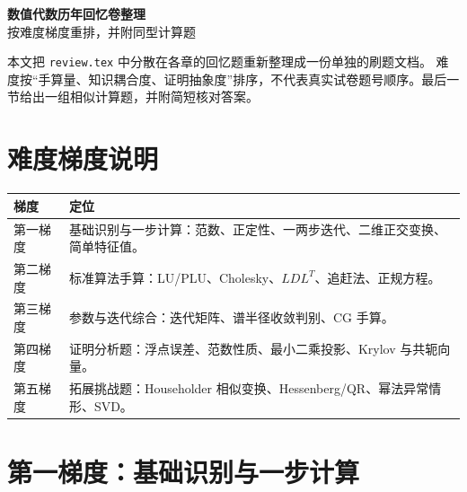 \documentclass{article}
\begin{document}
\pagestyle{fancy}
\fancyhead{}
\rhead{\today}

\begin{center}
  {\Large\bfseries 数值代数历年回忆卷整理}\\[6pt]
  {\large 按难度梯度重排，并附同型计算题}
\end{center}

\noindent 本文把 \texttt{review.tex} 中分散在各章的回忆题重新整理成一份单独的刷题文档。
难度按“手算量、知识耦合度、证明抽象度”排序，不代表真实试卷题号顺序。最后一节给出一组相似计算题，并附简短核对答案。

\tableofcontents
\newpage

\section{难度梯度说明}

\begin{center}
\begin{tabular}{@{}p{2.2cm}p{11.5cm}@{}}
\toprule
\textbf{梯度} & \textbf{定位}\\
\midrule
第一梯度 & 基础识别与一步计算：范数、正定性、一两步迭代、二维正交变换、简单特征值。\\
第二梯度 & 标准算法手算：LU/PLU、Cholesky、$LDL^T$、追赶法、正规方程。\\
第三梯度 & 参数与迭代综合：迭代矩阵、谱半径收敛判别、CG 手算。\\
第四梯度 & 证明分析题：浮点误差、范数性质、最小二乘投影、Krylov 与共轭向量。\\
第五梯度 & 拓展挑战题：Householder 相似变换、Hessenberg/QR、幂法异常情形、SVD。\\
\bottomrule
\end{tabular}
\end{center}

\section{第一梯度：基础识别与一步计算}
\end{document}
